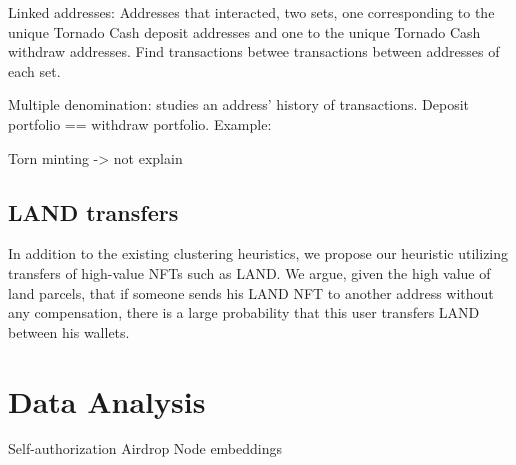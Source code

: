 \documentclass[12pt,a4paper,titlepage,oneside,english]{article}
\begin{document}
Linked addresses: Addresses that interacted, two sets, one corresponding to the unique Tornado Cash deposit addresses and one to the unique Tornado Cash withdraw addresses. Find transactions betwee transactions between addresses of each set.

Multiple denomination: studies an address' history of transactions. Deposit portfolio == withdraw portfolio. Example:

Torn minting -> not explain


\subsection{LAND transfers}
In addition to the existing clustering heuristics, we propose our heuristic utilizing transfers of high-value NFTs such as LAND. We argue, given the high value of land parcels, that if someone sends his LAND NFT to another address without any compensation, there is a large probability that this user transfers LAND between his wallets.



\section{Data Analysis}
Self-authorization
Airdrop
Node embeddings
\end{document}
